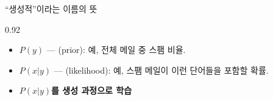 \begin{frame}{``생성적''이라는 이름의 뜻}
\begin{center}\begin{varwidth}{0.92\textwidth}
  \begin{itemize}
    \item $P(y)$ --- (prior): 예, 전체 메일 중 스팸 비율.
    \item $P(x|y)$ --- (likelihood): 예, 스팸 메일이 이런
      단어들을 포함할 확률.
    \item \textbf{$P(x|y)$를 생성 과정으로 학습}
    
  \end{itemize}
\end{varwidth}\end{center}
\end{frame}
